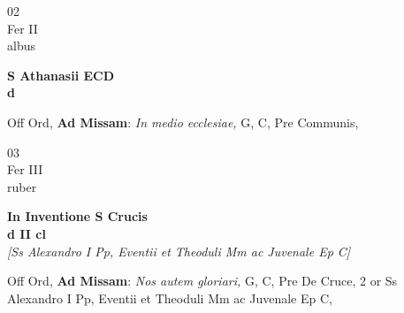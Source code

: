 \documentclass[10pt, openany]{book}
\begin{document}
        \begin{center}
            \begin{minipage}{3.5in}
                \vspace{2em}
                \begin{minipage}{0.5in}
                    {\Huge 02} \\
                    {\normalsize Fer II} \\
                    {\normalsize albus}
                \end{minipage}
                \begin{minipage}{3.0in}
                    \textbf{ \large S Athanasii ECD \\
                    \textnormal{\normalsize d}} \\ 
                \end{minipage}
                \begin{justify}Off Ord, \textbf{Ad Missam}: \textit{In medio ecclesiae,} G, C, Pre Communis,   
                \end{justify}
            \end{minipage}
        \end{center}
    
        \begin{center}
            \begin{minipage}{3.5in}
                \vspace{2em}
                \begin{minipage}{0.5in}
                    {\Huge 03} \\
                    {\normalsize Fer III} \\
                    {\normalsize ruber}
                \end{minipage}
                \begin{minipage}{3.0in}
                    \textbf{ \large In Inventione S Crucis \\
                    \textnormal{\normalsize d II cl}} \\ \textit{[Ss Alexandro I Pp, Eventii et Theoduli Mm ac Juvenale Ep C]} \\ 
                \end{minipage}
                \begin{justify}Off Ord, \textbf{Ad Missam}: \textit{Nos autem gloriari,} G, C, Pre De Cruce, 2 or Ss Alexandro I Pp, Eventii et Theoduli Mm ac Juvenale Ep C,   
                \end{justify}
            \end{minipage}
        \end{center}
    
\end{document}
